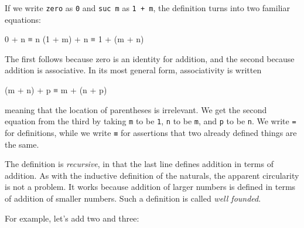 If we write \texttt{zero} as \texttt{0} and \texttt{suc\ m} as
\texttt{1\ +\ m}, the definition turns into two familiar equations:

\begin{myDisplay}
 0       + n  ≡  n
 (1 + m) + n  ≡  1 + (m + n)
\end{myDisplay}

The first follows because zero is an identity for addition, and the
second because addition is associative. In its most general form,
associativity is written

\begin{myDisplay}
 (m + n) + p  ≡  m + (n + p)
\end{myDisplay}

meaning that the location of parentheses is irrelevant. We get the
second equation from the third by taking \texttt{m} to be \texttt{1},
\texttt{n} to be \texttt{m}, and \texttt{p} to be \texttt{n}. We write
\texttt{=} for definitions, while we write \texttt{≡} for assertions
that two already defined things are the same.

The definition is \emph{recursive}, in that the last line defines
addition in terms of addition. As with the inductive definition of the
naturals, the apparent circularity is not a problem. It works because
addition of larger numbers is defined in terms of addition of smaller
numbers. Such a definition is called \emph{well founded}.

For example, let's add two and three:

